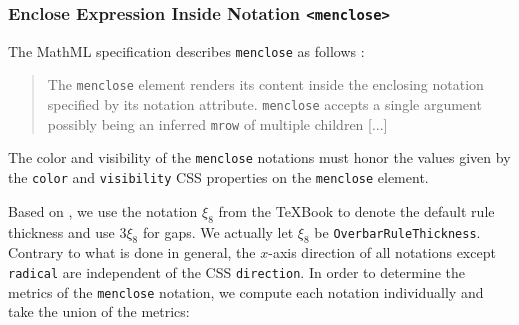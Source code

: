\subsubsection{Enclose Expression Inside Notation {\tt <menclose>}}\label{menclose}

The MathML specification describes {\tt menclose} as follows \cite{MathML3}:
%
\begin{quote}
The {\tt menclose} element renders its content inside the enclosing notation
specified by its notation attribute. {\tt menclose} accepts a single argument
possibly being an inferred {\tt mrow} of multiple children [...]
\end{quote}

The color and visibility of the {\tt menclose} notations must honor the values
given by the {\tt color} and {\tt visibility} CSS properties on the
{\tt menclose} element.

Based on \cite{OpenFontFormat3} \cite{TeXBook}, we use the notation $\xi_8$
from the TeXBook to denote the default rule thickness and use $3\xi_8$ for gaps.
We actually let $\xi_8$ be {\tt OverbarRuleThickness}.
Contrary to what is done in general, the $x$-axis direction of all notations
except {\tt radical} are independent of the CSS {\tt direction}.
In order to determine the metrics of the {\tt menclose} notation, we
compute each notation individually and take the union of the metrics:

